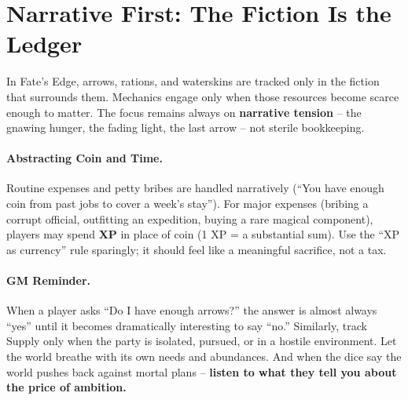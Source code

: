 \section{Narrative First: The Fiction Is the Ledger}
\label{sec:resources-narrative-first}

In Fate’s Edge, arrows, rations, and waterskins are tracked only in the fiction that surrounds them. Mechanics engage only when those resources become scarce enough to matter. The focus remains always on \textbf{narrative tension} – the gnawing hunger, the fading light, the last arrow – not sterile bookkeeping.

\paragraph{Abstracting Coin and Time.}
Routine expenses and petty bribes are handled narratively (“You have enough coin from past jobs to cover a week’s stay”). For major expenses (bribing a corrupt official, outfitting an expedition, buying a rare magical component), players may spend \textbf{XP} in place of coin (1 XP = a substantial sum). Use the “XP as currency” rule sparingly; it should feel like a meaningful sacrifice, not a tax.

\paragraph{GM Reminder.}
When a player asks “Do I have enough arrows?” the answer is almost always “yes” until it becomes dramatically interesting to say “no.” Similarly, track Supply only when the party is isolated, pursued, or in a hostile environment. Let the world breathe with its own needs and abundances. And when the dice say the world pushes back against mortal plans – \textbf{listen to what they tell you about the price of ambition.}